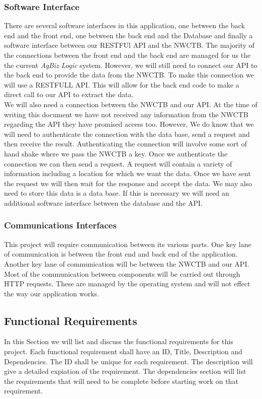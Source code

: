 \documentclass[onecolumn, draftclsnofoot,10pt, compsoc]{article}
\begin{document}
        \subsubsection{Software Interface}
					There are several software interfaces in this application, one between the back end and the front end, one between the back end and the Database and finally a software interface between our RESTFUl API and the NWCTB. The majority of the connections between the front end and the back end are managed for us the the current \textit{AgBiz Logic} system. However, we will still need to connect our API to the back end to provide the data from the NWCTB. To make this connection we will use a RESTFULL API. This will allow for the back end code to make a direct call to our API to extract the data.\\
					We will also need a connection between the NWCTB and our API. At the time of writing this document we have not received any information from the NWCTB regarding the API they have promised access too. However, We do know that we will need to authenticate the connection with the data base, send a request and then receive the result. Authenticating the connection will involve some sort of hand shake where we pass the NWCTB a key. Once we authenticate the connection we can then send a request. A request will contain a variety of information including a location for which we want the data. Once we have sent the request we will then wait for the response and accept the data. We may also need to store this data is a data base. If this is necessary we will need an additional software interface between the database and the API.\\

        \subsubsection{Communications Interfaces}
					This project will require communication between its various parts. One key lane of communication is between the front end and back end of the application. Another key lane of communication will be between the NWCTB and our API. Most of the communication between components will be carried out through HTTP requests. These are managed by the operating system and will not effect the way our application works.\\


		\subsection{Functional Requirements}
			In this Section we will list and discuss the functional requirements for this project. Each functional requirement shall have an ID, Title, Description and Dependencies. The ID shall be unique for each requirement. The description will give a detailed expiation of the requirement. The dependencies section will list the requirements that will need to be complete before starting work on that requirement.\\
\end{document}
